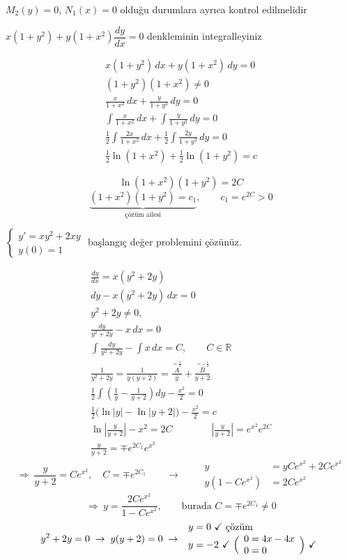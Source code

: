 \documentclass[11pt,a4paper]{article}
\begin{document}
$M_2(y)=0$, $N_1(x)=0$ olduğu durumlara ayrıca kontrol edilmelidir

\begin{ornek}
$x(1+y^2) + y(1+x^2)\dfrac{dy}{dx} = 0$ denkleminin integralleyiniz
\end{ornek}
\begin{gather*}
x(1+y^2)\,dx + y(1+x^2)\,dy = 0\\
(1+y^2)(1+x^2)\neq 0\\
\frac{x}{1+x^2}\,dx + \frac{y}{1+y^2}\,dy = 0\\
\int \frac{x}{1+x^2}\,dx + \int \frac{y}{1+y^2}\,dy = 0\\
\frac{1}{2}\int \frac{2x}{1+x^2}\,dx + \frac{1}{2}\int \frac{2y}{1+y^2}\,dy = 0\\
\frac{1}{2}\ln(1+x^2) + \frac{1}{2}\ln(1+y^2) = c
\end{gather*}

\[ \ln(1+x^2)(1+y^2) = 2C \]
\[ \underbrace{(1+x^2)(1+y^2) = c_1}_{\text{çözüm ailesi}}, \qquad c_1 = e^{2C} > 0 \]

\begin{ornek}
$\begin{cases} y' = xy^2 + 2xy\\ y(0) = 1 \end{cases}$ \qquad başlangıç değer problemini çözünüz.
\end{ornek}
\begin{gather*}
\frac{dy}{dx} = x(y^2+2y)\\
dy - x(y^2+2y)\,dx = 0\\
y^2+2y\neq 0,\\
\frac{dy}{y^2+2y} - x\,dx = 0\\
\int \frac{dy}{y^2+2y} - \int x\,dx = C, \qquad C\in\mathbb{R}\\
\frac{1}{y^2+2y} = \frac{1}{y(y+2)} = \frac{\overset{=\frac12}{A}}{y} + \frac{\overset{=-\frac12}{B}}{y+2}\\
\frac{1}{2}\int\left(\frac{1}{y} - \frac{1}{y+2}\right)dy - \frac{x^2}{2} = 0\\
\frac{1}{2}\bigl(\ln|y| - \ln|y+2|\bigr) - \frac{x^2}{2} = c\\
\ln\left|\frac{y}{y+2}\right| - x^2 = 2C \qquad\qquad \left|\frac{y}{y+2}\right| = e^{x^2}e^{2C}\\
\frac{y}{y+2} = \mp e^{2C_1}e^{x^2}
\end{gather*}
\[ \Rightarrow\ \frac{y}{y+2} = Ce^{x^2}, \quad C=\mp e^{2C_1}
\qquad\longrightarrow\qquad
\begin{aligned} y &= yCe^{x^2} + 2Ce^{x^2}\\ y(1-Ce^{x^2}) &= 2Ce^{x^2} \end{aligned} \]
\[ \Rightarrow\ y = \frac{2Ce^{x^2}}{1-Ce^{x^2}}, \qquad \text{burada } C=\mp e^{2C_1}\neq 0 \]
\[ y^2+2y = 0 \;\rightarrow\; y(y+2) = 0 \;\rightarrow\;
\begin{array}{l} y=0\ \checkmark \ \text{çözüm}\\ y=-2\ \checkmark\ \Bigl(\begin{array}{l}0 = 4x-4x\\ 0=0\end{array}\Bigr)\ \checkmark \end{array} \]
\end{document}
